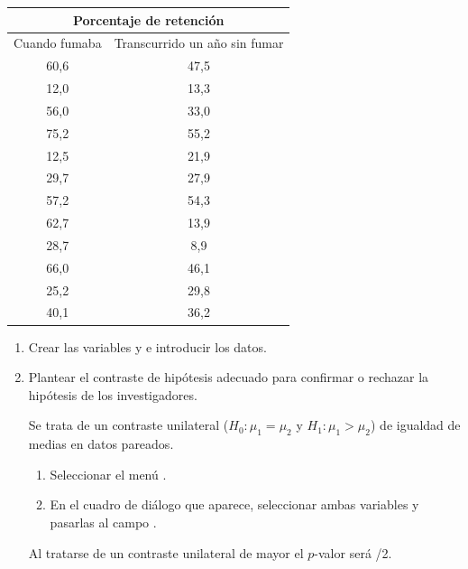 \begin{enumerate}[leftmargin=*]
\begin{center}
\begin{tabular}{ll}
\hline
\multicolumn{2}{c}{Porcentaje de retención} \\
\hline
Cuando fumaba & Transcurrido un año sin fumar \\
\hline
\multicolumn{1}{c}{60,6} & \multicolumn{1}{c}{47,5} \\
\multicolumn{1}{c}{12,0} & \multicolumn{1}{c}{13,3} \\
\multicolumn{1}{c}{56,0} & \multicolumn{1}{c}{33,0} \\
\multicolumn{1}{c}{75,2} & \multicolumn{1}{c}{55,2} \\
\multicolumn{1}{c}{12,5} & \multicolumn{1}{c}{21,9} \\
\multicolumn{1}{c}{29,7} & \multicolumn{1}{c}{27,9} \\
\multicolumn{1}{c}{57,2} & \multicolumn{1}{c}{54,3} \\
\multicolumn{1}{c}{62,7} & \multicolumn{1}{c}{13,9} \\
\multicolumn{1}{c}{28,7} & \multicolumn{1}{c}{8,9} \\
\multicolumn{1}{c}{66,0} & \multicolumn{1}{c}{46,1} \\
\multicolumn{1}{c}{25,2} & \multicolumn{1}{c}{29,8} \\
\multicolumn{1}{c}{40,1} & \multicolumn{1}{c}{36,2} \\
\hline
\end{tabular}
\end{center}


\begin{enumerate}
\item Crear las variables  y  e introducir los datos.

\item Plantear el contraste de hipótesis adecuado para confirmar o
rechazar la hipótesis de los investigadores.
\begin{indicacion}
Se trata de un contraste unilateral ($H_0: \mu_1=\mu_2$ y $H_1: \mu_1>\mu_2$) de igualdad de medias en datos pareados.
\begin{enumerate}
\item Seleccionar el menú .
\item En el cuadro de diálogo que aparece, seleccionar ambas variables y pasarlas al campo .
\end{enumerate}
Al tratarse de un contraste unilateral de mayor el $p$-valor será /2.
\end{indicacion}
\end{enumerate}



\end{enumerate}
